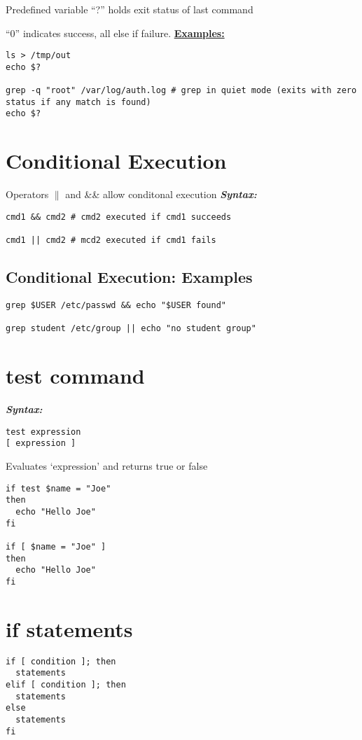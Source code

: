 \documentclass{report}
\begin{document}
\bigbreak \noindent
Predefined variable ``?'' holds exit status of last command \vspace{2mm}

\noindent ``0'' indicates success, all else if failure.
\newpage
\noindent \textbf{\underline{Examples:}}
\begin{verbatim}
ls > /tmp/out
echo $?

grep -q "root" /var/log/auth.log # grep in quiet mode (exits with zero status if any match is found)
echo $?
\end{verbatim}
\section{Conditional Execution}
Operators $\|$ and \&\& allow conditonal execution
\bigbreak \noindent
\textit{\textbf{Syntax:}}
\begin{verbatim}
cmd1 && cmd2 # cmd2 executed if cmd1 succeeds

cmd1 || cmd2 # mcd2 executed if cmd1 fails
\end{verbatim}
\subsection{Conditional Execution: Examples}
\begin{verbatim}
grep $USER /etc/passwd && echo "$USER found"

grep student /etc/group || echo "no student group"
\end{verbatim}
\section{test command}
\textit{\textbf{Syntax:}}
\begin{verbatim}
test expression
[ expression ]
\end{verbatim}
Evaluates `expression' and returns true or false
\begin{mdframed}
\begin{verbatim}
if test $name = "Joe"
then
  echo "Hello Joe"
fi

if [ $name = "Joe" ]
then 
  echo "Hello Joe"
fi
\end{verbatim}
\end{mdframed}
\section{if statements}
\begin{verbatim}
if [ condition ]; then
  statements
elif [ condition ]; then
  statements
else
  statements
fi
\end{verbatim}
\newpage
\end{document}
